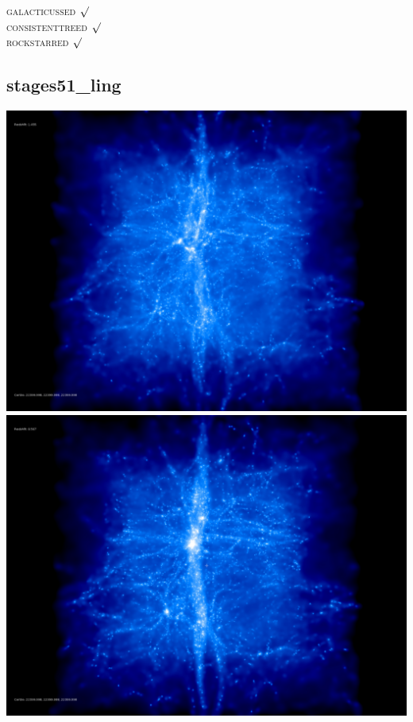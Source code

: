 \textsc{galacticussed} $\surd$ \\
\textsc{consistenttreed} $\surd$ \\ 
\textsc{rockstarred} $\surd$



% 
%
%
%
%
%
%
%


\newpage
\subsection{stages51\_ling}

\includegraphics[scale=0.1]{stages51_ling/50.jpg} 
\includegraphics[scale=0.1]{stages51_ling/100.jpg}  \\

